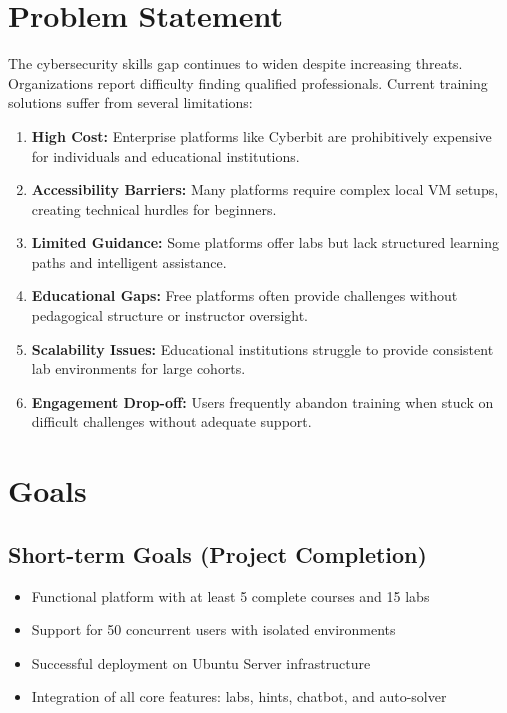 \documentclass[12pt,a4paper]{report}
\begin{document}
\section{Problem Statement}

The cybersecurity skills gap continues to widen despite increasing threats. Organizations report
difficulty finding qualified professionals. Current training solutions suffer from several limitations:
\begin{enumerate}
  \item \textbf{High Cost:} Enterprise platforms like Cyberbit are prohibitively expensive for individuals and educational institutions.
  \item \textbf{Accessibility Barriers:} Many platforms require complex local VM setups, creating technical hurdles for beginners.
  \item \textbf{Limited Guidance:} Some platforms offer labs but lack structured learning paths and intelligent assistance.
  \item \textbf{Educational Gaps:} Free platforms often provide challenges without pedagogical structure or instructor oversight.
  \item \textbf{Scalability Issues:} Educational institutions struggle to provide consistent lab environments for large cohorts.
  \item \textbf{Engagement Drop-off:} Users frequently abandon training when stuck on difficult challenges without adequate support.
\end{enumerate}

\section{Goals}

\subsection{Short-term Goals (Project Completion)}
\begin{itemize}
  \item Functional platform with at least 5 complete courses and 15 labs
  \item Support for 50 concurrent users with isolated environments
  \item Successful deployment on Ubuntu Server infrastructure
  \item Integration of all core features: labs, hints, chatbot, and auto-solver
\end{itemize}
\end{document}
